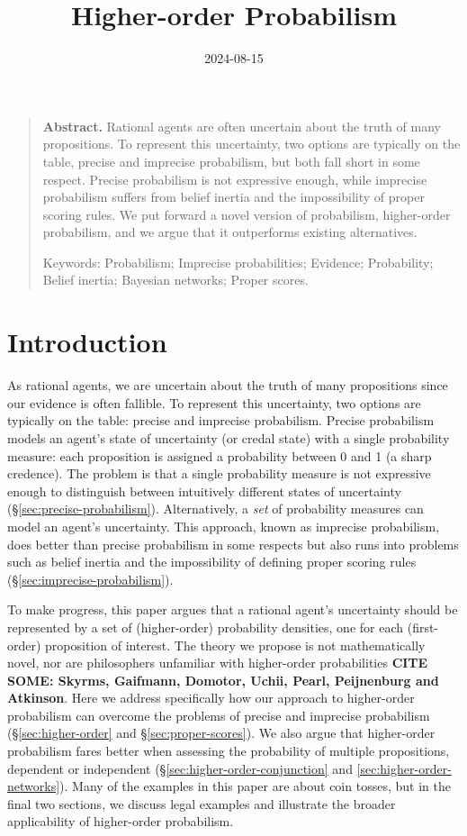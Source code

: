 \documentclass[
  letterpaper,
  DIV=11,
  numbers=noendperiod]{scrartcl}
\title{Higher-order Probabilism}
\author{}
\date{2024-08-15}
\begin{document}
\maketitle

\begin{quote} \textbf{Abstract.}  Rational agents are often uncertain about the truth of many propositions. To represent this uncertainty, two options are typically on the table, precise and imprecise probabilism, but both fall short in some respect. Precise probabilism is not expressive enough, while imprecise probabilism suffers from belief inertia and the impossibility of proper scoring rules. We put forward a novel version of probabilism, higher-order probabilism, and we argue that it outperforms existing alternatives.

Keywords: Probabilism; Imprecise probabilities; Evidence; Probability; Belief inertia; Bayesian networks; Proper scores.

\end{quote}

\section{Introduction}\label{introduction}

\label{sec:introduction}

As rational agents, we are uncertain about the truth of many
propositions since our evidence is often fallible. To represent this
uncertainty, two options are typically on the table: precise and
imprecise probabilism. Precise probabilism models an agent's state of
uncertainty (or credal state) with a single probability measure: each
proposition is assigned a probability between 0 and 1 (a sharp
credence). The problem is that a single probability measure is not
expressive enough to distinguish between intuitively different states of
uncertainty (\S \ref{sec:precise-probabilism}). Alternatively, a
\emph{set} of probability measures can model an agent's uncertainty.
This approach, known as imprecise probabilism, does better than precise
probabilism in some respects but also runs into problems such as belief
inertia and the impossibility of defining proper scoring rules
(\S \ref{sec:imprecise-probabilism}).

To make progress, this paper argues that a rational agent's uncertainty
should be represented by a set of (higher-order) probability densities,
one for each (first-order) proposition of interest. The theory we
propose is not mathematically novel, nor are philosophers unfamiliar
with higher-order probabilities \textbf{CITE SOME: Skyrms, Gaifmann,
Domotor, Uchii, Pearl, Peijnenburg and Atkinson}. Here we address
specifically how our approach to higher-order probabilism can overcome
the problems of precise and imprecise probabilism
(\S \ref{sec:higher-order} and \S \ref{sec:proper-scores}). We also
argue that higher-order probabilism fares better when assessing the
probability of multiple propositions, dependent or independent
(\S \ref{sec:higher-order-conjunction} and
\ref{sec:higher-order-networks}). Many of the examples in this paper are
about coin tosses, but in the final two sections, we discuss legal
examples and illustrate the broader applicability of higher-order
probabilism.
\end{document}
